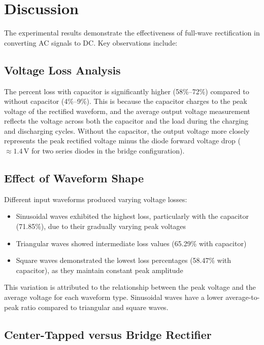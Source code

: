 \section{Discussion}

The experimental results demonstrate the effectiveness of full-wave rectification in converting AC signals to DC. Key observations include:

\subsection{Voltage Loss Analysis}

The percent loss with capacitor is significantly higher (58\%--72\%) compared to without capacitor (4\%--9\%). This is because the capacitor charges to the peak voltage of the rectified waveform, and the average output voltage measurement reflects the voltage across both the capacitor and the load during the charging and discharging cycles. Without the capacitor, the output voltage more closely represents the peak rectified voltage minus the diode forward voltage drop ($\approx 1.4\,\text{V}$ for two series diodes in the bridge configuration).

\subsection{Effect of Waveform Shape}

Different input waveforms produced varying voltage losses:
\begin{itemize}
  \item Sinusoidal waves exhibited the highest loss, particularly with the capacitor (71.85\%), due to their gradually varying peak voltages
  \item Triangular waves showed intermediate loss values (65.29\% with capacitor)
  \item Square waves demonstrated the lowest loss percentages (58.47\% with capacitor), as they maintain constant peak amplitude
\end{itemize}

This variation is attributed to the relationship between the peak voltage and the average voltage for each waveform type. Sinusoidal waves have a lower average-to-peak ratio compared to triangular and square waves.

\subsection{Center-Tapped versus Bridge Rectifier}

